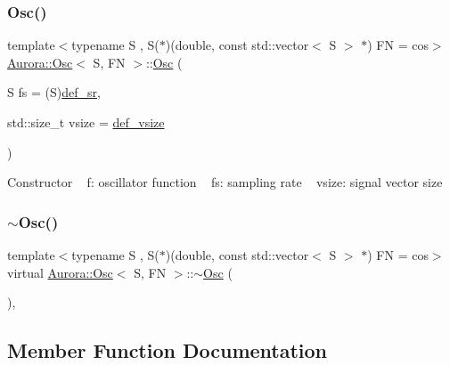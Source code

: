 \subsubsection{\texorpdfstring{Osc()}{Osc()}\hspace{0.1cm}{\footnotesize\ttfamily [2/2]}}
{\footnotesize\ttfamily template$<$typename S , S($\ast$)(double, const std\+::vector$<$ S $>$ $\ast$) FN = cos$>$ \\
\hyperlink{class_aurora_1_1_osc}{Aurora\+::\+Osc}$<$ S, FN $>$\+::\hyperlink{class_aurora_1_1_osc}{Osc} (\begin{DoxyParamCaption}\item[{S}]{fs = {\ttfamily (S)\hyperlink{namespace_aurora_ad49263d809bea98dd422e95bc91bc03e}{def\+\_\+sr}},  }\item[{std\+::size\+\_\+t}]{vsize = {\ttfamily \hyperlink{namespace_aurora_afaaddf667a06e7ce23c667a8b7295263}{def\+\_\+vsize}} }\end{DoxyParamCaption})\hspace{0.3cm}{\ttfamily [inline]}}

Constructor ~\newline
f\+: oscillator function ~\newline
fs\+: sampling rate ~\newline
vsize\+: signal vector size \mbox{\label{class_aurora_1_1_osc_a1c8857130cdc3f61acd835d3725df831}} 
\subsubsection{\texorpdfstring{$\sim$\+Osc()}{~Osc()}}
{\footnotesize\ttfamily template$<$typename S , S($\ast$)(double, const std\+::vector$<$ S $>$ $\ast$) FN = cos$>$ \\
virtual \hyperlink{class_aurora_1_1_osc}{Aurora\+::\+Osc}$<$ S, FN $>$\+::$\sim$\hyperlink{class_aurora_1_1_osc}{Osc} (\begin{DoxyParamCaption}{ }\end{DoxyParamCaption})\hspace{0.3cm}{\ttfamily [inline]}, {\ttfamily [virtual]}}



\subsection{Member Function Documentation}
\mbox{\label{class_aurora_1_1_osc_a10d968f92bf489112dd990c15cda6780}} 

